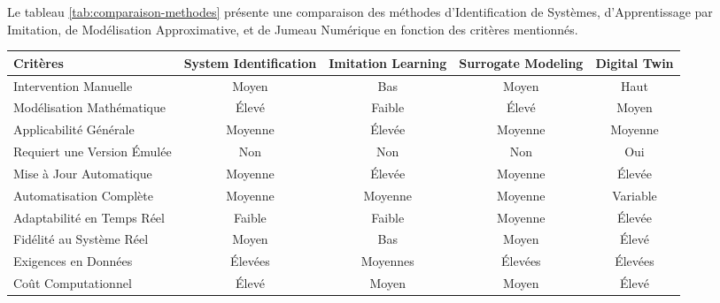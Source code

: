 \documentclass[sigconf,anonymous]{aamas}
\begin{document}
Le tableau \ref{tab:comparaison-methodes} présente une comparaison des méthodes d'Identification de Systèmes, d'Apprentissage par Imitation, de Modélisation Approximative, et de Jumeau Numérique en fonction des critères mentionnés.

\begin{table*}[h!]
\centering
\caption{Comparaison des méthodes de modélisation automatisée selon différents critères}
\begin{tabular}{p{4cm}cccc}
\textbf{Critères}                   & \textbf{System Identification} & \textbf{Imitation Learning} & \textbf{Surrogate Modeling} & \textbf{Digital Twin} \\
\hline
Intervention Manuelle    & Moyen                         & Bas                          & Moyen                       & Haut                 \\
Modélisation Mathématique & Élevé                         & Faible                       & Élevé                       & Moyen                \\
Applicabilité Générale             & Moyenne                       & Élevée                       & Moyenne                     & Moyenne              \\
Requiert une Version Émulée       & Non                           & Non                          & Non                         & Oui                  \\
Mise à Jour Automatique           & Moyenne                       & Élevée                       & Moyenne                     & Élevée               \\
Automatisation Complète            & Moyenne                       & Moyenne                      & Moyenne                     & Variable             \\
Adaptabilité en Temps Réel        & Faible                        & Faible                       & Moyenne                     & Élevée               \\
Fidélité au Système Réel & Moyen                         & Bas                          & Moyen                       & Élevé                \\
Exigences en Données               & Élevées                       & Moyennes                     & Élevées                     & Élevées              \\
Coût Computationnel                & Élevé                         & Moyen                        & Moyen                       & Élevé                \\
\end{tabular}
\label{tab:comparaison-methodes}
\end{table*}
\end{document}
